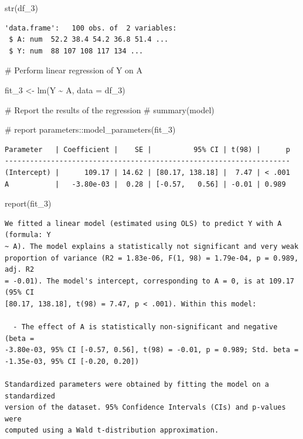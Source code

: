\documentclass[
  singlecolumn]{article}
\newenvironment{Shaded}{}{}
\newcommand{\AttributeTok}[1]{\textcolor[rgb]{0.84,0.23,0.29}{#1}}
\newcommand{\CommentTok}[1]{\textcolor[rgb]{0.42,0.45,0.49}{#1}}
\newcommand{\FunctionTok}[1]{\textcolor[rgb]{0.44,0.26,0.76}{#1}}
\newcommand{\NormalTok}[1]{\textcolor[rgb]{0.14,0.16,0.18}{#1}}
\newcommand{\OtherTok}[1]{\textcolor[rgb]{0.44,0.26,0.76}{#1}}
\newcommand{\SpecialCharTok}[1]{\textcolor[rgb]{0.00,0.36,0.77}{#1}}
\theoremstyle{definition}
\theoremstyle{remark}
\begin{document}
\begin{Shaded}
\begin{Highlighting}[]
\FunctionTok{str}\NormalTok{(df\_3)}
\end{Highlighting}
\end{Shaded}

\begin{verbatim}
'data.frame':   100 obs. of  2 variables:
 $ A: num  52.2 38.4 54.2 36.8 51.4 ...
 $ Y: num  88 107 108 117 134 ...
\end{verbatim}

\begin{Shaded}
\begin{Highlighting}[]
\CommentTok{\# Perform linear regression of Y on A}

\NormalTok{fit\_3 }\OtherTok{\textless{}{-}} \FunctionTok{lm}\NormalTok{(Y }\SpecialCharTok{\textasciitilde{}}\NormalTok{ A, }\AttributeTok{data =}\NormalTok{ df\_3)}

\CommentTok{\# Report the results of the regression}
\CommentTok{\# summary(model)}

\CommentTok{\# report}
\NormalTok{parameters}\SpecialCharTok{::}\FunctionTok{model\_parameters}\NormalTok{(fit\_3)}
\end{Highlighting}
\end{Shaded}

\begin{verbatim}
Parameter   | Coefficient |    SE |          95% CI | t(98) |      p
--------------------------------------------------------------------
(Intercept) |      109.17 | 14.62 | [80.17, 138.18] |  7.47 | < .001
A           |   -3.80e-03 |  0.28 | [-0.57,   0.56] | -0.01 | 0.989 
\end{verbatim}

\begin{Shaded}
\begin{Highlighting}[]
\FunctionTok{report}\NormalTok{(fit\_3)}
\end{Highlighting}
\end{Shaded}

\begin{verbatim}
We fitted a linear model (estimated using OLS) to predict Y with A (formula: Y
~ A). The model explains a statistically not significant and very weak
proportion of variance (R2 = 1.83e-06, F(1, 98) = 1.79e-04, p = 0.989, adj. R2
= -0.01). The model's intercept, corresponding to A = 0, is at 109.17 (95% CI
[80.17, 138.18], t(98) = 7.47, p < .001). Within this model:

  - The effect of A is statistically non-significant and negative (beta =
-3.80e-03, 95% CI [-0.57, 0.56], t(98) = -0.01, p = 0.989; Std. beta =
-1.35e-03, 95% CI [-0.20, 0.20])

Standardized parameters were obtained by fitting the model on a standardized
version of the dataset. 95% Confidence Intervals (CIs) and p-values were
computed using a Wald t-distribution approximation.
\end{verbatim}
\end{document}
